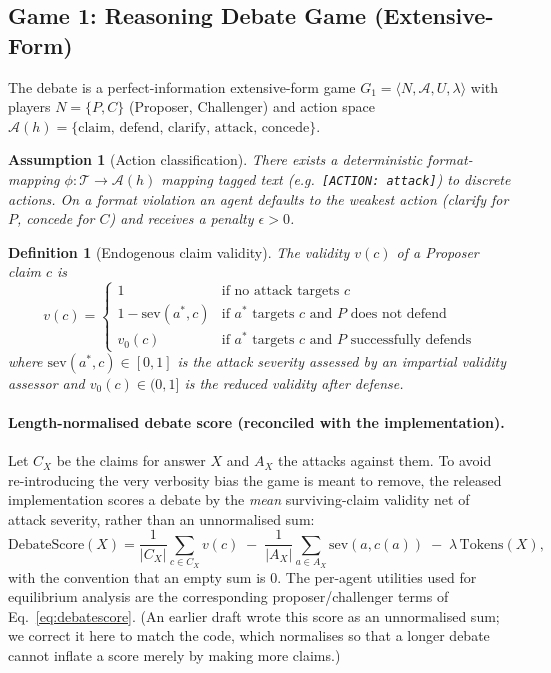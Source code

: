 \documentclass[11pt]{article}
\newtheorem{definition}{Definition}
\newtheorem{assumption}{Assumption}
\begin{document}
\subsection{Game 1: Reasoning Debate Game (Extensive-Form)}
The debate is a perfect-information extensive-form game
$G_1 = \langle N, \mathcal{A}, U, \lambda\rangle$ with players $N=\{P,C\}$
(Proposer, Challenger) and action space
$\mathcal{A}(h)=\{\text{claim, defend, clarify, attack, concede}\}$.

\begin{assumption}[Action classification]
There exists a deterministic format-mapping $\phi:\mathcal{T}\to\mathcal{A}(h)$
mapping tagged text (e.g.\ \texttt{[ACTION: attack]}) to discrete actions. On a
format violation an agent defaults to the weakest action (clarify for $P$,
concede for $C$) and receives a penalty $\epsilon>0$.
\end{assumption}

\begin{definition}[Endogenous claim validity]\label{def:validity}
The validity $v(c)$ of a Proposer claim $c$ is
\[
v(c) = \begin{cases}
1 & \text{if no attack targets } c\\
1 - \mathrm{sev}(a^*,c) & \text{if } a^* \text{ targets } c \text{ and } P \text{ does not defend}\\
v_0(c) & \text{if } a^* \text{ targets } c \text{ and } P \text{ successfully defends}
\end{cases}
\]
where $\mathrm{sev}(a^*,c)\in[0,1]$ is the attack severity assessed by an
impartial validity assessor and $v_0(c)\in(0,1]$ is the reduced validity after
defense.
\end{definition}

\paragraph{Length-normalised debate score (reconciled with the implementation).}
Let $C_X$ be the claims for answer $X$ and $A_X$ the attacks against them. To
avoid re-introducing the very verbosity bias the game is meant to remove, the
released implementation scores a debate by the \emph{mean} surviving-claim
validity net of attack severity, rather than an unnormalised sum:
\begin{equation}\label{eq:debatescore}
\mathrm{DebateScore}(X) =
\frac{1}{|C_X|}\!\sum_{c\in C_X}\! v(c)
\;-\; \frac{1}{|A_X|}\!\sum_{a\in A_X}\!\mathrm{sev}(a,c(a))
\;-\; \lambda\, \mathrm{Tokens}(X),
\end{equation}
with the convention that an empty sum is $0$. The per-agent utilities used for
equilibrium analysis are the corresponding proposer/challenger terms of
Eq.~\eqref{eq:debatescore}. (An earlier draft wrote this score as an
unnormalised sum; we correct it here to match the code, which normalises so
that a longer debate cannot inflate a score merely by making more claims.)
\end{document}
